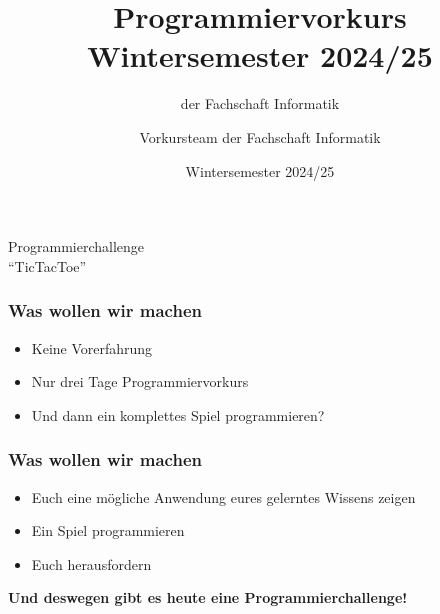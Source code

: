 
\usepackage{float}
\usepackage{listings}
\usepackage{graphicx}
\usepackage{epstopdf}
\usepackage{wrapfig}

\title[Programmiervorkurs]{Programmiervorkurs Wintersemester 2024/25}
\subtitle{{\small der Fachschaft Informatik}}
\author{Vorkursteam der Fachschaft Informatik}
\date{Wintersemester 2024/25}


\begin{frame}
    \begin{center}
        \vspace{2cm}
        {\huge Programmierchallenge \\ "`TicTacToe"'}
    \end{center}
\end{frame}


\begin{frame}
    \frametitle{Was wollen wir machen}
    \begin{itemize}
        \item Keine Vorerfahrung
        \item Nur drei Tage Programmiervorkurs
        \item Und dann ein komplettes Spiel programmieren?
    \end{itemize}
\end{frame}


\begin{frame}
    \frametitle{Was wollen wir machen}
    \begin{itemize}
        \item Euch eine mögliche Anwendung eures gelerntes Wissens zeigen
        \item Ein Spiel programmieren
        \item Euch herausfordern
    \end{itemize}
    \vspace{6mm}
    \begin{center}
        \textbf{\huge Und deswegen gibt es heute eine Programmierchallenge!}
    \end{center}

\end{frame}



